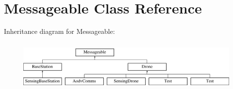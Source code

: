 \hypertarget{class_messageable}{}\section{Messageable Class Reference}
\label{class_messageable}
Inheritance diagram for Messageable\+:\begin{figure}[H]
\begin{center}
\leavevmode
\includegraphics[height=2.564885cm]{class_messageable}
\end{center}
\end{figure}
